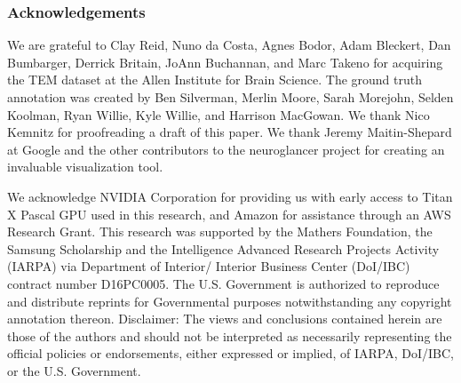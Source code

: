 \documentclass{article}
\begin{document}
\subsubsection*{Acknowledgements}
We are grateful to Clay Reid, Nuno da Costa, Agnes Bodor, Adam Bleckert, Dan
Bumbarger, Derrick Britain, JoAnn Buchannan, and Marc Takeno for acquiring the
TEM dataset at the Allen Institute for Brain Science. The ground truth
annotation was created by Ben Silverman, Merlin Moore, Sarah Morejohn, Selden
Koolman, Ryan Willie, Kyle Willie, and Harrison MacGowan. We thank Nico Kemnitz
for proofreading a draft of this paper. We thank Jeremy Maitin-Shepard at Google
and the other contributors to the neuroglancer project for creating an
invaluable visualization tool.

We acknowledge NVIDIA Corporation for providing us with early access to Titan X
Pascal GPU used in this research, and Amazon for assistance through an AWS
Research Grant. This research was supported by the Mathers Foundation, the
Samsung Scholarship and the Intelligence Advanced Research Projects Activity
(IARPA) via Department of Interior/ Interior Business Center (DoI/IBC) contract
number D16PC0005. The U.S. Government is authorized to reproduce and distribute
reprints for Governmental purposes notwithstanding any copyright annotation
thereon. Disclaimer: The views and conclusions contained herein are those of the
authors and should not be interpreted as necessarily representing the official
policies or endorsements, either expressed or implied, of IARPA, DoI/IBC, or the
U.S. Government.


\end{document}
